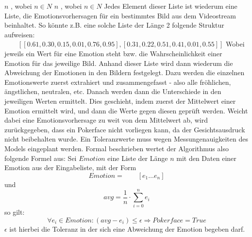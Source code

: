 \documentclass[12pt, a4paper]{report}
\begin{document}
$ n $  , wobei $ n \in N $	$ n $  , wobei $ n \in N $
Jedes Element dieser Liste ist wiederum eine Liste, die Emotionsvorhersagen für ein bestimmtes Bild aus dem Videostream beinhaltet. So könnte z.B. eine solche Liste der Länge 2 folgende Struktur aufweisen: \newline
$ \qquad[ [0.61, 0.30, 0.15, 0.01, 0.76, 0.95] , [0.31, 0.22, 0.51, 0.41, 0.01, 0.55] ] $
Wobei jeweils ein Wert für eine Emotion steht bzw. die Wahrscheinlichkeit einer Emotion für das jeweilige Bild. Anhand dieser Liste wird dann wiederum die Abweichung der Emotionen in den Bildern festgelegt. Dazu werden die einzelnen Emotionswerte zuerst extrahiert und zusammengefasst - also alle fröhlichen, ängstlichen, neutralen, etc. Danach werden dann die Unterschiede in den jeweiligen Werten ermittelt.
Dies geschieht, indem zuerst der Mittelwert einer Emotion ermittelt wird, und dann die Werte gegen diesen geprüft werden. Weicht dabei eine Emotionsvorhersage zu weit von dem Mittelwert ab, wird zurückgegeben, dass ein Pokerface nicht vorliegen kann, da der Gesichtsausdruck nicht beibehalten wurde. Ein Toleranzwerte muss wegen Messungenauigkeiten des Models eingeplant werden.
Formal beschrieben wertet der Algorithmus also folgende Formel aus: \newline
Sei $ Emotion $ eine Liste der Länge $ n $ mit den Daten einer Emotion aus der Eingabeliste, mit der Form $$ Emotion = \qquad [e_{1} \dots e_{n}] $$ 	
und $$avg =\frac{1}{n} \cdot \sum_{i = 0}^{n} e_{i} $$ so gilt:
\newline 
$$ \forall e_{i} \in Emotion : (avg - e_{i} ) \leq \epsilon \Rightarrow Pokerface = True $$	\newline
 $ \epsilon$ ist hierbei die Toleranz in der sich eine Abweichung der Emotion begeben darf.
\end{document}
